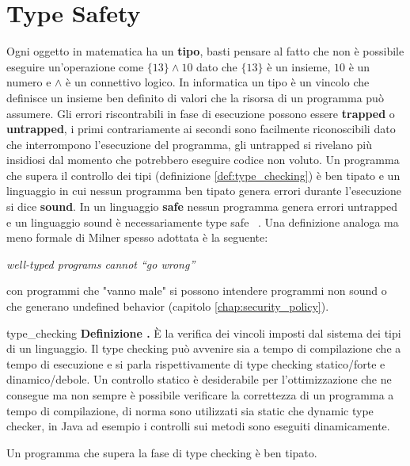 \documentclass[Lau,binding=0.6cm]{sapthesis}
\newenvironment{myDefinition}[2]{ \begin{Definizione}[adjusted title=#1]{}{#2}
    \textbf{Definizione \thetcbcounter.} }{\end{Definizione}}
\begin{document}
\chapter{Type Safety} \label{chap:type_safety}
Ogni oggetto in matematica ha un \textbf{tipo}, basti pensare al fatto che non è possibile eseguire un'operazione come $ \{13\} \land 10 $ dato che $\{13\}$ è un insieme, $10$ è un numero e $\land$ è un connettivo logico. 
In informatica un tipo è un vincolo che definisce un insieme ben definito di valori che la risorsa di un programma può assumere.
Gli errori riscontrabili in fase di esecuzione possono essere \textbf{trapped} o \textbf{untrapped}, i primi contrariamente ai secondi sono facilmente riconoscibili dato che interrompono l'esecuzione del programma, gli untrapped si rivelano più insidiosi dal momento che potrebbero eseguire codice non voluto.
Un programma che supera il controllo dei tipi (definizione \ref{def:type_checking}) è ben tipato e un linguaggio in cui nessun programma ben tipato genera errori durante l'esecuzione si dice \textbf{sound}.
In un linguaggio \textbf{safe} nessun programma genera errori untrapped e un linguaggio sound è necessariamente type safe ~\cite{cencia:dispense}.
Una definizione analoga ma meno formale di Milner spesso adottata è la seguente:

\begin{center}
   \textit{well-typed programs cannot “go wrong”} ~\cite{milner:type_polymorphism}
\end{center}

con programmi che "vanno male" si possono intendere programmi non sound o che generano undefined behavior (capitolo \ref{chap:security_policy}).

\begin{myDefinition}{Type checking}{type_checking}
    È la verifica dei vincoli imposti dal sistema dei tipi di un linguaggio.
    Il type checking può avvenire sia a tempo di compilazione che a tempo di esecuzione e si parla rispettivamente di type checking statico/forte e dinamico/debole.
    Un controllo statico è desiderabile per l'ottimizzazione che ne consegue ma non sempre è possibile verificare la correttezza di un programma a tempo di compilazione, di norma sono utilizzati sia static che dynamic type checker, in Java ad esempio i controlli sui metodi sono eseguiti dinamicamente.

    Un programma che supera la fase di type checking è ben tipato.     
\end{myDefinition}
\end{document}
